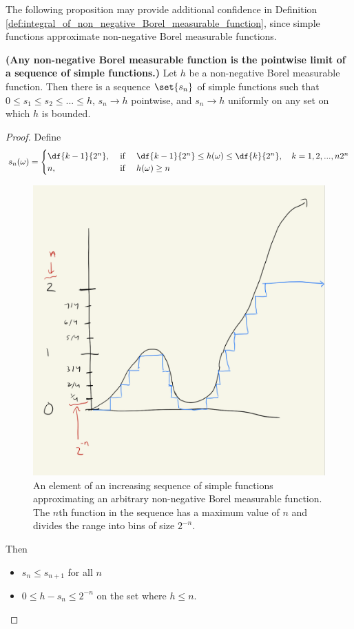 \documentclass{article} %
\begin{document}

The following proposition may provide additional confidence in Definition \ref{def:integral_of_non_negative_Borel_measurable_function}, since simple functions approximate non-negative Borel measurable functions.

\begin{proposition}\textbf{(Any non-negative Borel measurable function is the pointwise limit of a sequence of simple functions.)}
Let $h$ be a non-negative Borel measurable function.  Then there is a sequence $\set{s_n}$ of simple functions such that $0 \leq s_1 \leq s_2 \leq ... \leq h$, $s_n \to h$ pointwise, and $s_n \to h$ uniformly on any set on which $h$ is bounded.	
\label{prop:there_is_a_sequence_of_simple_fucntions_that_increases_to_any_non_negative_borel_measurable_function}
\end{proposition}

\begin{proof}
Define 
\[ s_n(\omega) = 
\begin{cases}
\df{k-1}{2^n}, & \text{ if } \quad \df{k-1}{2^n} \leq h(\omega) \leq \df{k}{2^n},\quad k=1,2,...,n2^n \\
n, & \text{ if } \quad h(\omega) \geq n 
\end{cases}
\]	

\begin{figure}[H]
\centering
\includegraphics[width=.7\textwidth]{images/approximate_nonnegative_with_simple}	
\caption{An element of an increasing sequence of simple functions approximating an arbitrary non-negative Borel measurable function. The $n$th function in the sequence has a maximum value of $n$ and divides the range into bins of size $2^{-n}$.}
\end{figure}


Then 
\begin{itemize}
\item $s_n \leq s_{n+1}$ for all $n$
\item $0 \leq h - s_n \leq 2^{-n}$ on the set where $h \leq n$.
\end{itemize}
\end{proof}
\end{document}
